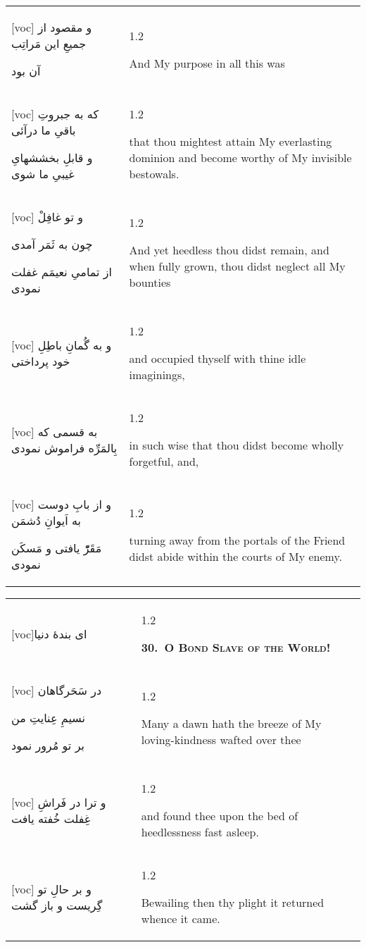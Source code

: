 \documentclass[11pt]{article}
\makeatletter
\newenvironment{orig}
  {\begin{farsi}[voc]}
  {\end{farsi}}
\newenvironment{trans}
  {\Large\begin{spacing}{1.2}\raggedright}
  {\end{spacing}}
\newenvironment{word}
  {\begin{tabular}[t]{p{2.75in}@{\hspace{3em}}p{2.875in}}}
  {\end{tabular}}
\newcommand{\ayat}[2]{\begin{orig}#1\end{orig} & \begin{trans}#2\end{trans}}
\newcommand{\heading}[2]{\textsc{\textbf{#1}} %
}
\makeatother
\begin{document}
\pagebreak

\begin{word}
\ayat{
و مقصود از جميعِ اين مَراتِب

آن بود
}{And My purpose in all this was} \\ \ayat{
که به جبروتِ باقیِ ما درآئی

و قابلِ بخششهایِ غيبیِ ما شوی
}{that thou mightest attain My everlasting dominion and become worthy of My
  invisible bestowals.} \vspace{-1ex}\\ \ayat{
و تو غافِلْ

چون به ثَمَر آمدی

از تمامیِ نعيمَم غفلت نمودی
}{And yet heedless thou didst remain, and when fully grown, thou didst neglect
  all My bounties} \vspace{-1ex}\\ \ayat{
و به گُمانِ باطِلِ خود پرداختی
}{and occupied thyself with thine idle imaginings,} \vspace{-1ex}\\ \ayat{
به قسمی که بِالمَرِّه فراموش نمودی
}{in such wise that thou didst become wholly forgetful, and,} \vspace{-1ex}\\ \ayat{
و از بابِ دوست به اَيوانِ دُشمَن

مَقَرّْ يافتی و مَسکَن نمودی
}{turning away from the portals of the Friend didst abide within the courts of
  My enemy.}
\end{word}

\pagebreak

\begin{word}
\ayat{ای بندۀ دنيا}{\heading{30.~O Bond Slave of the World!}{}} \\ \ayat{
در سَحَرگاهان

نسيمِ عِنايتِ من

بر تو مُرور نمود
}{Many a dawn hath the breeze of My loving-kindness wafted over thee} \\ \ayat{
و ترا در فَراشِ غِفلت خُفته يافت
}{and found thee upon the bed of heedlessness fast asleep.} \vspace{-1ex}\\ \ayat{
و بر حالِ تو گِريست و باز گشت
}{Bewailing then thy plight it returned whence it came.}
\end{word}

\pagebreak

\end{document}
